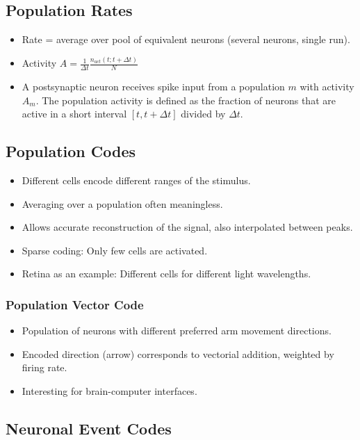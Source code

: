 \documentclass[main]{subfiles}
\begin{document}
\subsection{Population Rates}
\begin{itemize}[noitemsep,nolistsep]
	\item Rate = average over pool of equivalent neurons (several neurons, single run).
	\item Activity $A=\frac{1}{\Delta t}\frac{n_{act}(t;t+\Delta t)}{N}$
	\item A postsynaptic neuron receives spike input from a population $m$ with activity $A_m$. The population activity is defined as the fraction of neurons that are active in a short interval $[t,t+\Delta t]$ divided by $\Delta t$.
\end{itemize}

\subsection{Population Codes}
\begin{itemize}[noitemsep,nolistsep]
	\item Different cells encode different ranges of the stimulus.
	\item Averaging over a population often meaningless.
	\item Allows accurate reconstruction of the signal, also interpolated between peaks.
	\item Sparse coding: Only few cells are activated.
	\item Retina as an example: Different cells for different light wavelengths.
\end{itemize}

\subsubsection{Population Vector Code}
\begin{itemize}[noitemsep,nolistsep]
	\item Population of neurons with different preferred arm movement directions.
	\item Encoded direction (arrow) corresponds to vectorial addition, weighted by firing rate.
	\item Interesting for brain-computer interfaces.
\end{itemize}

\subsection{Neuronal Event Codes}
\end{document}
